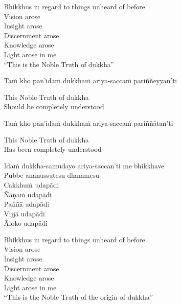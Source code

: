 \begin{english-verses}
  Bhikkhus in regard to things unheard of before\\
  Vision arose\\
  Insight arose\\
  Discernment arose\\
  Knowledge arose\\
  Light arose in me\makeatletter\hyperlink{endnote55-appendix}\makeatother\\
  ``This is the Noble Truth of dukkha''
\end{english-verses}

Taṁ kho pan'idaṁ dukkhaṁ ariya-saccaṁ pariññeyyan'ti

\begin{english}
  This Noble Truth of dukkha\makeatletter\hyperlink{endnote56-appendix}\makeatother\\
  Should be completely understood
\end{english}

Taṁ kho pan'idaṁ dukkhaṁ ariya-saccaṁ pariññātan'ti

\begin{english}
  This Noble Truth of dukkha\\
  Has been completely understood
\end{english}

Idaṁ dukkha-samudayo ariya-saccan'ti me bhikkhave\\
Pubbe ananussutesu dhammesu\\
Cakkhuṁ udapādi\\
Ñāṇaṁ udapādi\\
Paññā udapādi\\
Vijjā udapādi\\
Āloko udapādi

\begin{english-verses}
  Bhikkhus in regard to things unheard of before\\
  Vision arose\\
  Insight arose\\
  Discernment arose\\
  Knowledge arose\\
  Light arose in me\\
  ``This is the Noble Truth of the origin of dukkha''
\end{english-verses}

